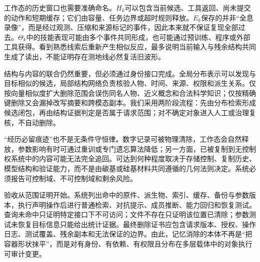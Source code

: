 工作态的历史窗口也需要准确命名。$H_k$可以包含当前候选、工具返回、尚未提交的动作和短期缓存；它们由容量、任务边界或超时规则释放。$E_k$保存的并非“全息录像”，而是经过观测、压缩和来源标记的事件，因此本来就不保证复现全部过去。$\Theta_k$中的技能表现可能由多个事件共同形成，也可能通过预训练、程序或外部工具获得。看到熟悉线索后重新产生相似反应，最多说明当前输入与残余结构共同生成了读出，不能证明存在测地线必然复活旧波形。

结构与内容的联合仍然重要，但必须通过身份接口完成。全局分布表示可以发现与目标相似的候选，局部结构网络负责核验人物、时间、来源、权限和派生关系。仅按向量相似度扩大删除范围会误伤同名人物、近义概念和合法科学知识；仅按精确键删除又会漏掉改写摘要和跨模态副本。我们采用两阶段流程：先由分布检索形成候选闭包，再由结构证据判定是否属于请求范围；对不确定对象进入人工或治理复核，不自动删除。

“经历必留痕迹”也不是无条件守恒律。数字记录可被物理清除，工作态会自然释放，参数影响有时可通过重训或专门遗忘算法降低；另一方面，已被复制到无控制权系统中的内容可能无法完全追回。可达到何种程度取决于存储控制、复制历史、模型结构和验证能力，而不是由碳基或硅基材料共同遵循的几何法则决定。系统必须报告可控制域、不可控制域和剩余风险。

验收从范围证明开始。系统列出命中的原件、派生物、索引、缓存、备份与参数版本，执行声明操作后进行普通检索、对抗提示、成员推断、能力回归和恢复测试。查询未命中只证明特定接口下不可访问；文件不存在只证明该位置已清除；参数测试未恢复目标信息只能给出统计证据。最终删除证书应包含请求版本、授权、操作日志、测试覆盖、残余副本和无法保证的边界。由此，记忆消除的本体不再是“把容器形状抹平”，而是对有身份、有依赖、有权限且分布在多层载体中的对象执行可审计变更。
